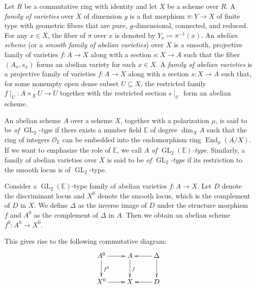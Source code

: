 \documentclass[12pt,twoside]{book}
\theoremstyle{plain}
\theoremstyle{definition}
\theoremstyle{remark}
\newcommand{\mO}{{\mathcal O}}
\DeclareMathOperator\End{End}
\DeclareMathOperator\GL{GL}
\numberwithin{equation}{section}
\def\EK{{\mathbb E}}
\begin{document}
Let $R$ be a commutative ring with identity and let $X$ be a scheme over $R$. A \emph{family of varieties} over $X$ of dimension $g$ is a flat morphism $\pi\colon Y\rightarrow X$ of finite type with geometric fibers that are pure, $g$-dimensional, connected, and reduced. For any $x\in X$, the fiber of $\pi$ over $x$ is denoted by $Y_x\coloneqq\pi^{-1}(x)$. An \emph{abelian scheme} (or a \emph{smooth family of abelian varieties}) over $X$ is a smooth, projective family of varieties $f\colon A\rightarrow X$ along with a section $s\colon X\rightarrow A$ such that the fiber $(A_x,s_x)$ forms an abelian variety for each $x\in X$. A \emph{family of abelian varieties} is a projective family of varieties $f\colon A\rightarrow X$ along with a section $s\colon X\rightarrow A$ such that, for some nonempty open dense subset $U\subseteq X$, the restricted family $f\mid_U\colon A\times_XU\rightarrow U$ together with the restricted section $s\mid_U$ form an abelian scheme.

An abelian scheme $A$ over a scheme $X$, together with a polarization $\mu$, is said to be \emph{of $\GL_2$-type} if there exists a number field $\EK$ of degree $\dim_X A$ such that the ring of integers $\mO_\EK$ can be embedded into the endomorphism ring $\End_{\mu}(A/X)$. If we want to emphasize the role of $\EK$, we call $A$ \emph{of $\GL_2(\EK)$-type}. Similarly, a family of abelian varieties over $X$ is said to be \emph{of $\GL_2$-type} if its restriction to the smooth locus is of $\GL_2$-type.

Consider a $\GL_2(\EK)$-type family of abelian varieties $f\colon A\rightarrow X$. Let $D$ denote the discriminant locus and $X^0$ denote the smooth locus, which is the complement of $D$ in $X$. We define $\Delta$ as the inverse image of $D$ under the structure morphism $f$ and $A^0$ as the complement of $\Delta$ in $A$. Then we obtain an abelian scheme $f^0\colon A^0\rightarrow X^0$.

This gives rise to the following commutative diagram:
\begin{equation}
\xymatrix{
A^0\ar[r] \ar[d]^{f^0} & A \ar[d]^f & \Delta \ar[d]\ar[l] \\
X^0\ar[r] & X & D \ar[l] \\
}
\end{equation}
\end{document}
